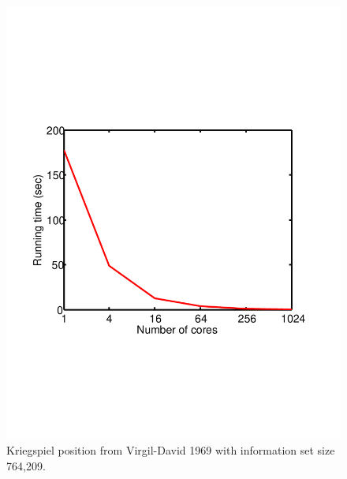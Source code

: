 \documentclass[times, 10pt,twocolumn]{article}
\begin{document}
\begin{figure}[htpb]
 \centering \includegraphics[scale=0.4]{images/KriegspielProblem4.pdf} %
\caption{Kriegspiel position from Virgil-David 1969 with information set size 764,209.}
\label{prob4} 
\end{figure}
\end{document}
